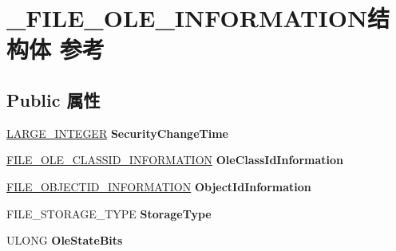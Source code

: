\hypertarget{struct___f_i_l_e___o_l_e___i_n_f_o_r_m_a_t_i_o_n}{}\section{\+\_\+\+F\+I\+L\+E\+\_\+\+O\+L\+E\+\_\+\+I\+N\+F\+O\+R\+M\+A\+T\+I\+O\+N结构体 参考}
\label{struct___f_i_l_e___o_l_e___i_n_f_o_r_m_a_t_i_o_n}
\subsection*{Public 属性}
\begin{DoxyCompactItemize}
\item 
\mbox{\label{struct___f_i_l_e___o_l_e___i_n_f_o_r_m_a_t_i_o_n_aca2fe3955355b5f13ce8559cadf0690f}} 
\hyperlink{union___l_a_r_g_e___i_n_t_e_g_e_r}{L\+A\+R\+G\+E\+\_\+\+I\+N\+T\+E\+G\+ER} {\bfseries Security\+Change\+Time}
\item 
\mbox{\label{struct___f_i_l_e___o_l_e___i_n_f_o_r_m_a_t_i_o_n_af532cf5677744b78ee448474f07c9d4e}} 
\hyperlink{struct___f_i_l_e___o_l_e___c_l_a_s_s_i_d___i_n_f_o_r_m_a_t_i_o_n}{F\+I\+L\+E\+\_\+\+O\+L\+E\+\_\+\+C\+L\+A\+S\+S\+I\+D\+\_\+\+I\+N\+F\+O\+R\+M\+A\+T\+I\+ON} {\bfseries Ole\+Class\+Id\+Information}
\item 
\mbox{\label{struct___f_i_l_e___o_l_e___i_n_f_o_r_m_a_t_i_o_n_a5a56739c49f712502baff8d1133b4755}} 
\hyperlink{struct___f_i_l_e___o_b_j_e_c_t_i_d___i_n_f_o_r_m_a_t_i_o_n}{F\+I\+L\+E\+\_\+\+O\+B\+J\+E\+C\+T\+I\+D\+\_\+\+I\+N\+F\+O\+R\+M\+A\+T\+I\+ON} {\bfseries Object\+Id\+Information}
\item 
\mbox{\label{struct___f_i_l_e___o_l_e___i_n_f_o_r_m_a_t_i_o_n_a2a030d121e453a81bc68d7bb6f1d96ec}} 
F\+I\+L\+E\+\_\+\+S\+T\+O\+R\+A\+G\+E\+\_\+\+T\+Y\+PE {\bfseries Storage\+Type}
\item 
\mbox{\label{struct___f_i_l_e___o_l_e___i_n_f_o_r_m_a_t_i_o_n_ae848829bba5b6c0a6ca4a88d35713fdc}} 
U\+L\+O\+NG {\bfseries Ole\+State\+Bits}

\end{DoxyCompactItemize}
